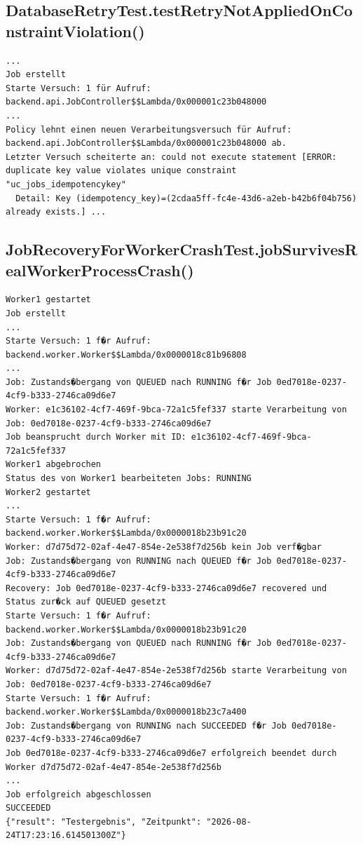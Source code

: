 \subsection*{DatabaseRetryTest.testRetryNotAppliedOnConstraintViolation()}
\label{subsec:testlog_z6_b}
\begin{lstlisting}[language={}, style=logs, numbers=none]
...
Job erstellt
Starte Versuch: 1 für Aufruf: backend.api.JobController$$Lambda/0x000001c23b048000
...
Policy lehnt einen neuen Verarbeitungsversuch für Aufruf: backend.api.JobController$$Lambda/0x000001c23b048000 ab.
Letzter Versuch scheiterte an: could not execute statement [ERROR: duplicate key value violates unique constraint "uc_jobs_idempotencykey"
  Detail: Key (idempotency_key)=(2cdaa5ff-fc4e-43d6-a2eb-b42b6f04b756) already exists.] ...
\end{lstlisting}

\subsection*{JobRecoveryForWorkerCrashTest.jobSurvivesRealWorkerProcessCrash()}
\label{subsec:testlog_z7}
\begin{lstlisting}[language={}, style=logs, numbers=none]
Worker1 gestartet
Job erstellt
...
Starte Versuch: 1 f�r Aufruf: backend.worker.Worker$$Lambda/0x0000018c81b96808
...
Job: Zustands�bergang von QUEUED nach RUNNING f�r Job 0ed7018e-0237-4cf9-b333-2746ca09d6e7
Worker: e1c36102-4cf7-469f-9bca-72a1c5fef337 starte Verarbeitung von Job: 0ed7018e-0237-4cf9-b333-2746ca09d6e7
Job beansprucht durch Worker mit ID: e1c36102-4cf7-469f-9bca-72a1c5fef337
Worker1 abgebrochen
Status des von Worker1 bearbeiteten Jobs: RUNNING
Worker2 gestartet
...
Starte Versuch: 1 f�r Aufruf: backend.worker.Worker$$Lambda/0x0000018b23b91c20
Worker: d7d75d72-02af-4e47-854e-2e538f7d256b kein Job verf�gbar
Job: Zustands�bergang von RUNNING nach QUEUED f�r Job 0ed7018e-0237-4cf9-b333-2746ca09d6e7
Recovery: Job 0ed7018e-0237-4cf9-b333-2746ca09d6e7 recovered und Status zur�ck auf QUEUED gesetzt
Starte Versuch: 1 f�r Aufruf: backend.worker.Worker$$Lambda/0x0000018b23b91c20
Job: Zustands�bergang von QUEUED nach RUNNING f�r Job 0ed7018e-0237-4cf9-b333-2746ca09d6e7
Worker: d7d75d72-02af-4e47-854e-2e538f7d256b starte Verarbeitung von Job: 0ed7018e-0237-4cf9-b333-2746ca09d6e7
Starte Versuch: 1 f�r Aufruf: backend.worker.Worker$$Lambda/0x0000018b23c7a400
Job: Zustands�bergang von RUNNING nach SUCCEEDED f�r Job 0ed7018e-0237-4cf9-b333-2746ca09d6e7
Job 0ed7018e-0237-4cf9-b333-2746ca09d6e7 erfolgreich beendet durch Worker d7d75d72-02af-4e47-854e-2e538f7d256b
...
Job erfolgreich abgeschlossen
SUCCEEDED
{"result": "Testergebnis", "Zeitpunkt": "2026-08-24T17:23:16.614501300Z"}
\end{lstlisting}

